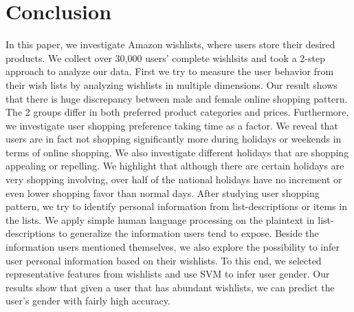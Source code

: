 \section{Conclusion}
In this paper, we investigate Amazon wishlists, where users store their desired products. We collect over 30,000 users' complete wishlsits and took a 2-step approach to analyze our data. First we try to measure the user behavior from their wish lists by analyzing wishlists in multiple dimensions. Our result shows that there is huge discrepancy between male and female online shopping pattern. The 2 groups differ in both preferred product categories and prices. Furthermore, we investigate user shopping preference taking time as a factor. We reveal that users are in fact not shopping significantly more during holidays or weekends in terms of online shopping. We also investigate different holidays that are shopping appealing or repelling. We highlight that although there are certain holidays are very shopping involving, over half of the national holidays have no increment or even lower shopping favor than normal days. After studying user shopping pattern, we try to identify personal information from list-descriptions or items in the lists. We apply simple human language processing on the plaintext in list-descriptions to generalize the information users tend to expose. Beside the information users mentioned themselves, we also explore the possibility to infer user personal information based on their wishlists. To this end, we selected representative features from wishlists and use SVM to infer user gender. Our results show that given a user that has abundant wishlists, we can predict the user's gender with fairly high accuracy.

